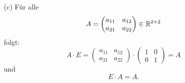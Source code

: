 \documentclass[
				a4paper,
				10pt
			]
			{scrartcl}
\begin{document}
\begin{itemize}
$$		$$		
	\item[(c)]
		F\"ur alle
		$$
			A 
			=
			\begin{pmatrix}
				a_{11}	&a_{12}	\\
				a_{21}	&a_{22}
			\end{pmatrix} 
			\in \mathbb{R}^{2\times 2}
		$$
		folgt:
		$$
			A\cdot E 
			=
			\begin{pmatrix}
				a_{11}	&a_{12}	\\
				a_{21}	&a_{22}
			\end{pmatrix} 
			\cdot
			\begin{pmatrix}
				1	&	0\\
				0	&	1
			\end{pmatrix}			
			=
			A
		$$
		und
		$$
			E\cdot A = A.
		$$
\end{itemize}
\end{document}
